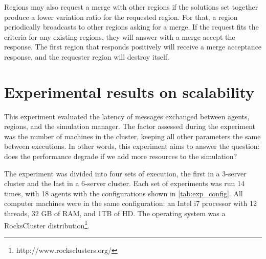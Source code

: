 \documentclass[preprint,12pt]{elsarticle}
\begin{document}
Regions may also request a merge with other regions if the solutions set together produce a lower variation ratio for the requested region. For that, a region periodically broadcasts to other regions asking for a merge. If the request fits the criteria for any existing regions, they will answer with a merge accept the response. The first region that responds positively will receive a merge acceptance response, and the requester region will destroy itself. 

\section{Experimental results on scalability}
\label{sec:experiment}
This experiment evaluated the latency of messages exchanged between agents, regions, and the simulation manager. The factor assessed during the experiment was the number of machines in the cluster, keeping all other parameters the same between executions. In other words, this experiment aims to answer the question: does the performance degrade if we add more resources to the simulation?

The experiment was divided into four sets of execution, the first in a 3-server cluster and the last in a 6-server cluster. Each set of experiments was run 14 times, with 18 agents with the configurations shown in \autoref{tab:exp_config}. All computer machines were in the same configuration: an Intel i7 processor with 12 threads, 32 GB of RAM, and 1TB of HD. The operating system was a RocksCluster distribution\footnote{http://www.rocksclusters.org/}. 
\end{document}
